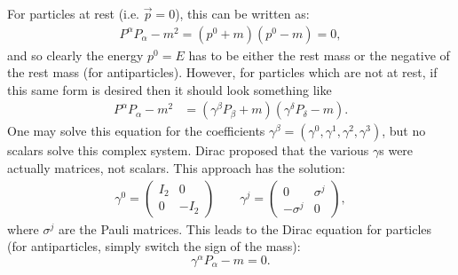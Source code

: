 For particles at rest (i.e. $\vec{p}=0$), this can be written as:
\begin{align*}
P^\alpha P_\alpha - m^2 = (p^0+m)(p^0-m)=0,
\end{align*}
and so clearly the energy $p^0=E$ has to be either the rest mass or the negative
of the rest mass
(for antiparticles). However, for particles which are not at rest, if this same
form is desired
then it should look something like
\begin{align*}
P^\alpha P_\alpha - m^2 &= (\gamma^\beta P_\beta + m)(\gamma^\delta P_\delta
-m).
\end{align*}
One may solve this equation for the coefficients
$\gamma^\beta=(\gamma^0,\gamma^1,\gamma^2,\gamma^3)$, but no scalars solve this
complex system.
Dirac proposed that the various $\gamma$s were actually matrices, not scalars.
This approach has the solution:
\begin{align*}
\gamma^0=
\begin{pmatrix}
I_2 & 0\\
0 & -I_2
\end{pmatrix} \qquad \gamma^j=
\begin{pmatrix}
0 & \sigma^j\\
-\sigma^j & 0
\end{pmatrix},
\end{align*}
where $\sigma^j$ are the Pauli matrices. This leads to the Dirac equation for
particles (for
antiparticles, simply switch the sign of the mass):
\begin{equation}\label{eqn:diracEquation}
\gamma^\alpha P_\alpha - m = 0.
\end{equation}

